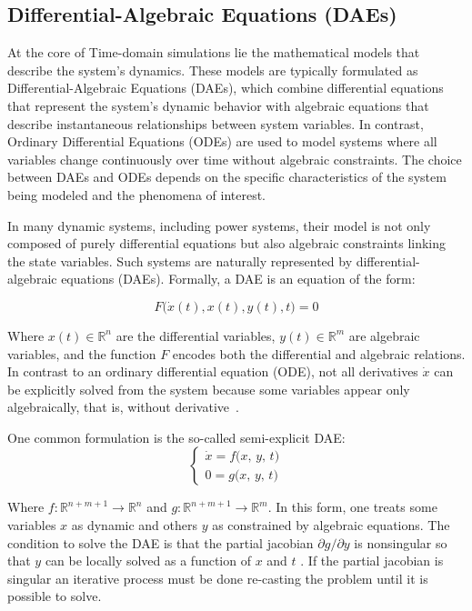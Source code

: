 \subsection{Differential-Algebraic Equations (DAEs)}

At the core of Time-domain simulations lie the mathematical models that describe the system's dynamics. These models are typically formulated as Differential-Algebraic Equations
(DAEs), which combine differential equations that represent the system's dynamic behavior with algebraic equations that describe instantaneous relationships between system variables. 
In contrast, Ordinary Differential Equations (ODEs) are used to model systems where all variables change continuously over time without algebraic constraints. 
The choice between DAEs and ODEs depends on the specific characteristics of the system being modeled and the phenomena of interest.

In many dynamic systems, including power systems, their model is not only composed of purely differential equations but also algebraic constraints linking the state
variables. Such systems are naturally represented by differential-algebraic equations (DAEs). Formally, a DAE is an equation of the form: 

\begin{equation}
  F\bigl(\dot{x}(t), x(t), y(t), t\bigr) = 0
\end{equation}


Where $x(t)\in \mathbb{R}^n$ are the differential variables, $y(t)\in \mathbb{R}^m$ are algebraic variables, and the function
 $F$ encodes both the differential and algebraic relations. 
In contrast to an ordinary differential equation (ODE), not all derivatives $\dot{x}$ can be explicitly solved from the system because some variables appear only 
algebraically, that is, without derivative~\cite{CasellaDAE}.

One common formulation is the so-called semi-explicit DAE:  
\begin{equation}
\begin{cases}
\dot x = f\bigl(x,\,y,\,t\bigr) \\
0 = g\bigl(x,\,y,\,t\bigr)
\end{cases}
\end{equation} 

Where $f\colon \mathbb{R}^{n+m+1} \to \mathbb{R}^n$ and $g\colon \mathbb{R}^{n+m+1} \to \mathbb{R}^m$. In this form, one treats some variables $x$ as dynamic and others $y$
as constrained by algebraic equations. The condition to solve the DAE is that the partial jacobian $\partial g / \partial y$ is nonsingular so that $y$ can be locally solved as
a function of $x$ and $t$ \cite{CasellaDAE}. If the partial jacobian is singular an iterative process must be done re-casting the problem until it is possible to solve.  


